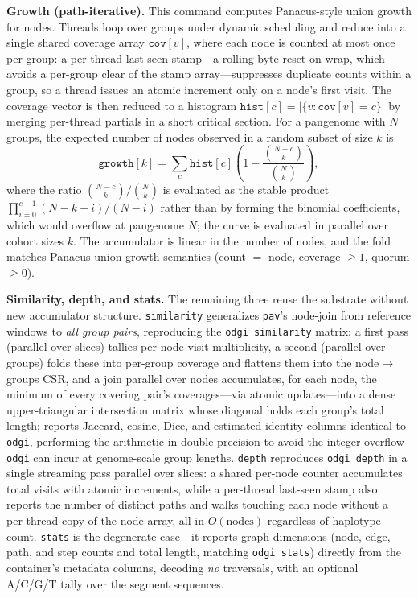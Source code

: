 \noindent\textbf{Growth (path-iterative).}
This command computes Panacus-style union growth for nodes. Threads loop over groups
under dynamic scheduling and reduce into a single shared coverage array
$\texttt{cov}[v]$, where each node is counted at most once per group: a per-thread
last-seen stamp---a rolling byte reset on wrap, which avoids a per-group clear of the
stamp array---suppresses duplicate counts within a group, so a thread issues an
atomic increment only on a node's first visit. The coverage vector is then reduced to
a histogram $\texttt{hist}[c]=|\{v:\texttt{cov}[v]=c\}|$ by merging per-thread
partials in a short critical section. For a pangenome with $N$ groups, the expected
number of nodes observed in a random subset of size $k$ is
\[
  \texttt{growth}[k]
    =
  \sum_c \texttt{hist}[c]
    \left(1-\frac{\binom{N-c}{k}}{\binom{N}{k}}\right),
\]
where the ratio $\binom{N-c}{k}/\binom{N}{k}$ is evaluated as the stable product
$\prod_{i=0}^{c-1}(N-k-i)/(N-i)$ rather than by forming the binomial coefficients,
which would overflow at pangenome $N$; the curve is evaluated in parallel over cohort
sizes $k$. The accumulator is linear in the number of nodes, and the fold matches
Panacus union-growth semantics (count $=$ node, coverage $\ge 1$, quorum $\ge 0$).

\noindent\textbf{Similarity, depth, and stats.}
The remaining three reuse the substrate without new accumulator structure.
\texttt{similarity} generalizes \texttt{pav}'s node-join from reference windows to
\emph{all group pairs}, reproducing the \texttt{odgi similarity} matrix: a first pass
(parallel over slices) tallies per-node visit multiplicity, a second (parallel over
groups) folds these into per-group coverage and flattens them into the
node$\rightarrow$groups CSR, and a join parallel over nodes accumulates, for each
node, the minimum of every covering pair's coverages---via atomic updates---into a
dense upper-triangular intersection matrix whose diagonal holds each group's total
length; \gfaz reports Jaccard, cosine, Dice, and estimated-identity columns identical
to \texttt{odgi}, performing the arithmetic in double precision to avoid the integer
overflow \texttt{odgi} can incur at genome-scale group lengths. \texttt{depth}
reproduces \texttt{odgi depth} in a single streaming pass parallel over slices: a
shared per-node counter accumulates total visits with atomic increments, while a
per-thread last-seen stamp also reports the number of distinct paths and walks
touching each node without a per-thread copy of the node array, all in
$O(\text{nodes})$ regardless of haplotype count. \texttt{stats} is the degenerate
case---it reports graph dimensions (node, edge, path, and step counts and total
length, matching \texttt{odgi stats}) directly from the container's metadata columns,
decoding \emph{no} traversals, with an optional A/C/G/T tally over the segment
sequences.

